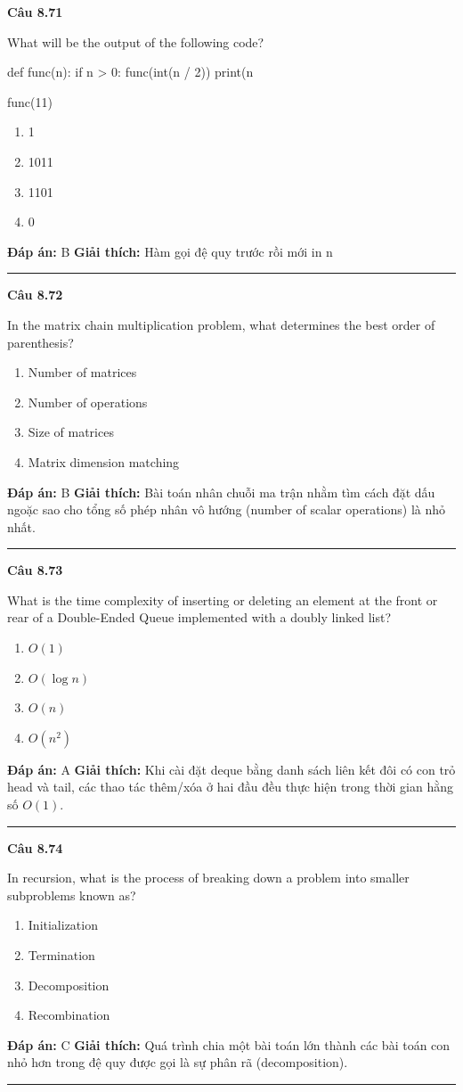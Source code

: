 \documentclass[11pt,a4paper]{article}
\newenvironment{question}[1]{%
  \par\vspace{1em}\noindent\textbf{\large Câu #1}\par\vspace{0.4em}
}{%
  \par\vspace{1em}\hrule\vspace{0.6em}
}
\newenvironment{choices}{%
  \begin{enumerate}[label=\textbf{\Alph*.},leftmargin=2.2em,itemsep=2pt,topsep=3pt]
}{%
  \end{enumerate}
}
\newcommand{\choice}{\item}
\newenvironment{codebox}{%
  \begin{tcolorbox}[colback=gray!8!white,colframe=gray!50!black,arc=1.5mm,boxrule=0.6pt,left=3mm,right=3mm,top=2.5mm,bottom=2.5mm]
  \ttfamily\small
}{%
  \end{tcolorbox}
}
\begin{document}
\begin{question}{8.71}
What will be the output of the following code?
\begin{codebox}
def func(n):
    if n > 0:
        func(int(n / 2))
        print(n %

func(11)
\end{codebox}
\begin{choices}
\choice 1
\choice 1011
\choice 1101
\choice 0
\end{choices}
\textbf{Đáp án:} B
\textbf{Giải thích:} Hàm gọi đệ quy trước rồi mới in n %
\end{question}

\begin{question}{8.72}
In the matrix chain multiplication problem, what determines the best order of parenthesis?
\begin{choices}
\choice Number of matrices
\choice Number of operations
\choice Size of matrices
\choice Matrix dimension matching
\end{choices}
\textbf{Đáp án:} B
\textbf{Giải thích:} Bài toán nhân chuỗi ma trận nhằm tìm cách đặt dấu ngoặc sao cho tổng số phép nhân vô hướng (number of scalar operations) là nhỏ nhất.
\end{question}

\begin{question}{8.73}
What is the time complexity of inserting or deleting an element at the front or rear of a Double-Ended Queue implemented with a doubly linked list?
\begin{choices}
\choice \(O(1)\)
\choice \(O(\log n)\)
\choice \(O(n)\)
\choice \(O(n^2)\)
\end{choices}
\textbf{Đáp án:} A
\textbf{Giải thích:} Khi cài đặt deque bằng danh sách liên kết đôi có con trỏ head và tail, các thao tác thêm/xóa ở hai đầu đều thực hiện trong thời gian hằng số \(O(1)\).
\end{question}

\begin{question}{8.74}
In recursion, what is the process of breaking down a problem into smaller subproblems known as?
\begin{choices}
\choice Initialization
\choice Termination
\choice Decomposition
\choice Recombination
\end{choices}
\textbf{Đáp án:} C
\textbf{Giải thích:} Quá trình chia một bài toán lớn thành các bài toán con nhỏ hơn trong đệ quy được gọi là sự phân rã (decomposition).
\end{question}
\end{document}
